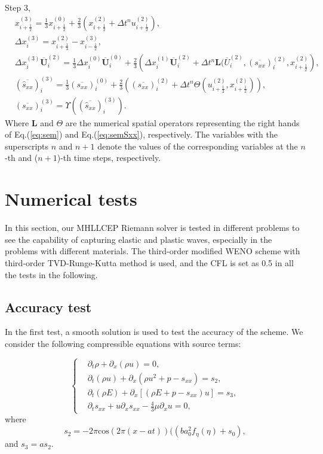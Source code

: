 \documentclass[review]{elsarticle}
\begin{document}
Step 3,
\begin{equation}
  \begin{aligned}
    & x_{i+\frac{1}{2}}^{(3)} = \frac{1}{3} x_{i+\frac{1}{2}}^{(0)}+\frac{2}{3} \left( x_{i+\frac{1}{2}}^{(2)}+\Delta t^n u_{i+\frac{1}{2}}^{(2)}\right),\\
    & \Delta x_i^{(3)} =  x_{i+\frac{1}{3}}^{(2)}- x_{i-\frac{1}{2}}^{(3)},\\
    & \Delta x_i^{(3)} \overline{\mathbf{U}}_i^{(2)}  = \frac{1}{3} \Delta x_i^{(0)} \overline{\mathbf{U}}_i^{(0)}+ \frac{2}{3} \left(  \Delta x_i^{(1)} \overline{\mathbf{U}}_i^{(2)} + \Delta t^n \mathbf{L}(\overline{U}_i^{(2)}, (\overline{s_{xx}})_i^{(2)}, x_{i+\frac{1}{2}}^{(2)} \right),\\
    & (\overline{\hat{s}_{xx}})_i^{(3)} =\frac{1}{3} (\overline{s_{xx}})_i^{(0)} + \frac{2}{3} \left(  (\overline{s_{xx}})_i^{(2)}+\Delta t^ n \varTheta (u_{i+\frac{1}{2}}^{(2)}, x_{i+\frac{1}{2}}^{(2)})\right),\\
  & (\overline{s_{xx}})_i^{(3)} = \Upsilon((\overline{\hat{s}_{xx}})_i^{(3)}).
\end{aligned}
\end{equation}
Where $\mathbf{L}$ and $\varTheta$ are the numerical spatial operators representing the right hands of Eq.(\ref{eq:sem}) and Eq.(\ref{eq:semSxx}), respectively. The variables with the superscripts $n$ and $n+1$ denote the values of the corresponding variables at the $n$-th and ($n+1$)-th time steps, respectively.

\section{Numerical tests}
In this section, our MHLLCEP Riemann solver is tested  in different problems to see the capability of  capturing elastic and plastic waves, especially in the problems  with different materials. The third-order modified  WENO scheme\cite{liu2018novel} with third-order TVD-Runge-Kutta method \cite{shu1988efficient} is used, and the CFL is set as  0.5 in all the tests in the following. 

\subsection{Accuracy test}
In the first test, a smooth solution is used to test the accuracy of the scheme.  We consider the following compressible equations with source terms:

\begin{equation}
  \left\{
  \begin{aligned}
&	\partial_t \rho + \partial_x(\rho u) = 0, \\
&	\partial_t (\rho u) + \partial_x(\rho u^2 + p -s_{xx}) = s_2, \\
&  \partial_t (\rho E) + \partial_x[(\rho E + p -s_{xx})u] = s_3, \\
& \partial_t s_{xx} + u\partial_x s_{xx} - \frac{4}{3}\mu \partial_x u =0,
\end{aligned}
\right.
\end{equation}
where  
$$s_2 = -2\pi \text{cos}(2\pi (x-at))((ba_0^2f_\eta(\eta)+s_0),$$
  and $ s_3 = as_2 .$
\end{document}
